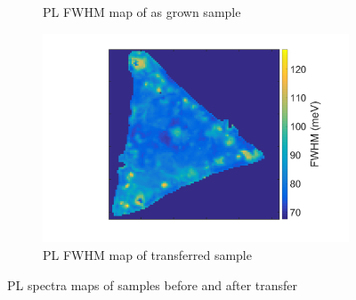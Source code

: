\begin{figure}[H]
\begin{center}
\begin{subfigure}[b]{0.4\textwidth}
			\caption{PL FWHM map of as grown sample}
			\label{fig:TransferPLWidthMapAsgrown}
		\end{subfigure}
		\quad
		\begin{subfigure}[b]{0.4\textwidth}
			\includegraphics[scale=0.15]{Transfer/TransferPLWidthMapTransferred.png}
			\caption{PL FWHM map of transferred sample}
		\label{fig:TransferPLWidthMapTransferred}
		\end{subfigure}
		\caption{PL spectra maps of samples before and after transfer}
		\label{fig:TransferPLMapsComparison}
	\end{center}
\end{figure}
	
